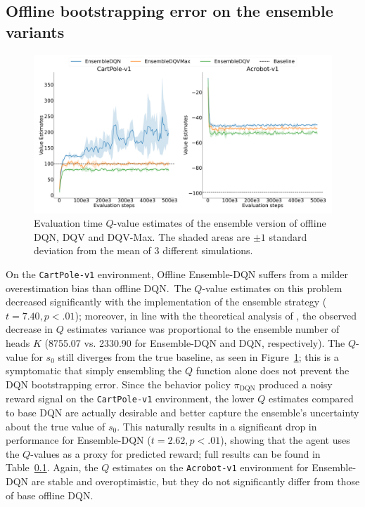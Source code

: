 \subsection{Offline bootstrapping error on the ensemble variants}
\begin{figure}[!tbp]
  \centering
  \includegraphics[width=.5\textwidth]{img/dshift_plots_ensembles_qv.png}
  \caption{Evaluation time $Q$-value estimates of the ensemble version
    of offline DQN, DQV and DQV-Max. The shaded areas are $\pm 1$
    standard deviation from the mean of 3 different
    simulations.}\label{fig:dshift_offline_ensemble}
\end{figure}
On the \texttt{CartPole-v1} environment, Offline Ensemble-DQN suffers
from a milder overestimation bias than offline DQN.\ The $Q$-value
estimates on this problem decreased significantly with the
implementation of the ensemble strategy ($t=7.40,p<.01$); moreover, in
line with the theoretical analysis of \citet{anschel2017averaged}, the
observed decrease in $Q$ estimates variance was proportional to the
ensemble number of heads $K$ (8755.07 vs. 2330.90 for Ensemble-DQN and
DQN, respectively). The $Q$-value for $s_0$ still diverges from the
true baseline, as seen in Figure~\ref{fig:dshift_offline_ensemble};
this is a symptomatic that simply ensembling the $Q$ function alone
does not prevent the DQN bootstrapping error. Since the behavior
policy $\pi_{\textrm{DQN}}$ produced a noisy reward signal on the
\texttt{CartPole-v1} environment, the lower $Q$ estimates compared to
base DQN are actually desirable and better capture the ensemble's
uncertainty about the true value of $s_0$. This naturally results in a
significant drop in performance for Ensemble-DQN ($t=2.62,p<.01$),
showing that the agent uses the $Q$-values as a proxy for predicted
reward; full results can be found in Table~\ref{}. Again, the $Q$
estimates on the \texttt{Acrobot-v1} environment for Ensemble-DQN are
stable and overoptimistic, but they do not significantly differ from
those of base offline DQN.\

